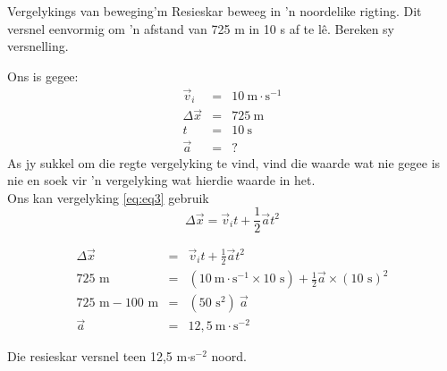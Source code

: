 \begin{wex}{Vergelykings van beweging}{'m Resieskar beweeg in 'n noordelike rigting. Dit versnel eenvormig om 'n afstand van 725 m in 10 s af te l\^e. Bereken sy versnelling.}
{
Ons is gegee:
\begin{eqnarray*}
\vec{v}_i&=&10\ \text{m} \cdot \text{s}^{-1}\\
\Delta \vec{x}&=&725\ \text{m}\\
t&=&10\ \text{s}\\
\vec{a}&=&?
\end{eqnarray*}
As jy sukkel om die regte vergelyking te vind, vind die waarde wat nie gegee is nie en soek vir 'n vergelyking wat hierdie waarde in het. \\
Ons kan vergelyking \ref{eq:eq3} gebruik
\begin{displaymath}
\Delta \vec{x}=\vec{v}_it +\frac{1}{2}\vec{a}t^2
\end{displaymath}

\begin{eqnarray*}
\Delta \vec{x} &=& \vec{v}_it +\frac{1}{2}\vec{a}t^2\\
725\text{~m} &=& (10~\text{m}\cdot \text{s}^{-1} \times 10\text{~s}) + \frac{1}{2} \vec{a} \times (10\text{~s})^2\\
725\text{~m} - 100\text{~m} &=& (50\text{~s}^2)~ \vec{a}\\
\vec{a} &=& 12,5~ \text{m} \cdot\text{s}^{-2}
\end{eqnarray*}

Die resieskar versnel teen 12,5 m$\cdot$s$^{-2}$ noord.}
\end{wex}

